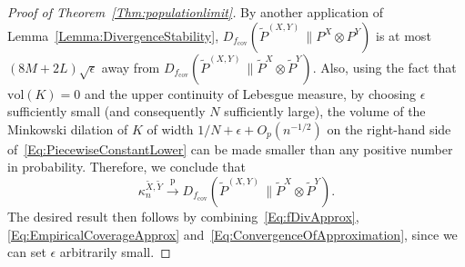 \documentclass[11pt]{article}
\newcommand{\vol}{\mathrm{vol}}
\newcommand{\pto}{\xrightarrow{\,\mathrm{p}\,} }
\begin{document}
\begin{proof}[Proof of Theorem~\ref{Thm:populationlimit}]
By another application of Lemma~\ref{Lemma:DivergenceStability}, $D_{f_\mathrm{cov}}(\tilde P^{(X,Y)}\,\| P^X\otimes P^Y)$ is at most $(8M+2L)\sqrt{\epsilon}$ away from $D_{f_\mathrm{cov}}(\tilde P^{(X,Y)}\,\| \tilde P^X\otimes \tilde P^Y)$. Also, using the fact that $\vol(K)=0$ and the upper continuity of Lebesgue measure, by choosing $\epsilon$ sufficiently small (and consequently $N$ sufficiently large), the volume of the Minkowski dilation of $K$ of width $1/N+\epsilon+O_p(n^{-1/2})$ on the right-hand side of~\eqref{Eq:PiecewiseConstantLower} can be made smaller than any positive number in probability. Therefore, we conclude that
\begin{equation}
\label{Eq:ConvergenceOfApproximation}
\kappa_n^{\tilde X,\tilde Y} \pto D_{f_\mathrm{cov}}(\tilde P^{(X,Y)}\,\| \tilde P^X\otimes \tilde P^Y).
\end{equation}
The desired result then follows by combining~\eqref{Eq:fDivApprox}, \eqref{Eq:EmpiricalCoverageApprox} and~\eqref{Eq:ConvergenceOfApproximation}, since we can set $\epsilon$ arbitrarily small.
\end{proof}
\end{document}
